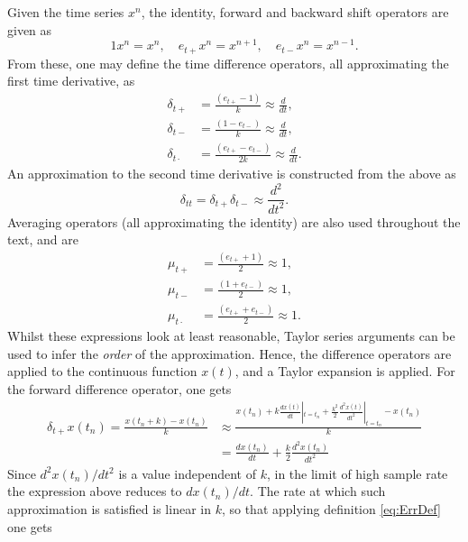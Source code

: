\documentclass[11pt,twoside,a4paper,english]{book}
\newcommand{\etp}{e_{t+}}
\newcommand{\etm}{e_{t-}}
\newcommand{\dtp}{\delta_{t+}}
\newcommand{\dtm}{\delta_{t-}}
\newcommand{\dtd}{\delta_{t\cdot}}
\newcommand{\dtt}{\delta_{tt}}
\newcommand{\mtp}{\mu_{t+}}
\newcommand{\mtm}{\mu_{t-}}
\newcommand{\mtd}{\mu_{t\cdot}}
\begin{document}
Given the time series $x^n$, the identity, forward and backward shift operators are given as
\begin{equation}
    {1}{x}^n = { x}^n, \quad \etp {x}^n = { x}^{n+1}, \quad \etm { x}^n = { x}^{n-1}.
\end{equation}
From these, one may define the time difference operators, all approximating the first time derivative, as
\begin{subequations}
    \begin{align}
        \dtp & = \frac{(\etp - 1)}{k} \approx \frac{d}{dt},     \\ 
        \dtm & = \frac{(1 - \etm)}{k}\approx \frac{d}{dt},      \\ 
        \dtd & = \frac{(\etp - \etm)}{2k}\approx \frac{d}{dt} . 
    \end{align}
\end{subequations}
An approximation to the second time derivative is constructed from the above as
\begin{equation}
    \dtt  = \dtp\dtm\approx \frac{d^2}{dt^2}.
\end{equation}
Averaging operators (all approximating the identity) are also used throughout the text, and are
\begin{subequations}
    \begin{align}
        \mtp & = \frac{(\etp + 1)}{2} \approx 1,    \\ 
        \mtm & = \frac{(1 + \etm)}{2} \approx 1,    \\ 
        \mtd & = \frac{(\etp + \etm)}{2} \approx 1. 
    \end{align}
\end{subequations}
Whilst these expressions look at least reasonable, Taylor series arguments can be used to infer the \emph{order} of the approximation. Hence, the difference operators are applied to the  continuous function $x(t)$, and a Taylor expansion is applied. For the forward difference operator, one gets
\begin{align*}
    \dtp x(t_n) = \frac{x(t_n+k) - x(t_n)}{k} & \approx \frac{x(t_n)+ k \frac{dx(t)}{dt}|_{t=t_n}+\frac{k^2}{2}\frac{d^2x(t)}{dt^2}|_{t=t_n}-x(t_n)}{k} \\&= \frac{dx(t_n)}{dt}+\frac{k}{2}\frac{d^2x(t_n)}{dt^2}
\end{align*}
Since ${d^2x(t_n)}/{dt^2}$ is a value independent of $k$, in the limit of high sample rate the expression above reduces to ${dx(t_n)}/{dt}$. The rate at which such approximation is satisfied is linear in $k$, so that applying definition \eqref{eq:ErrDef} one gets
\end{document}
